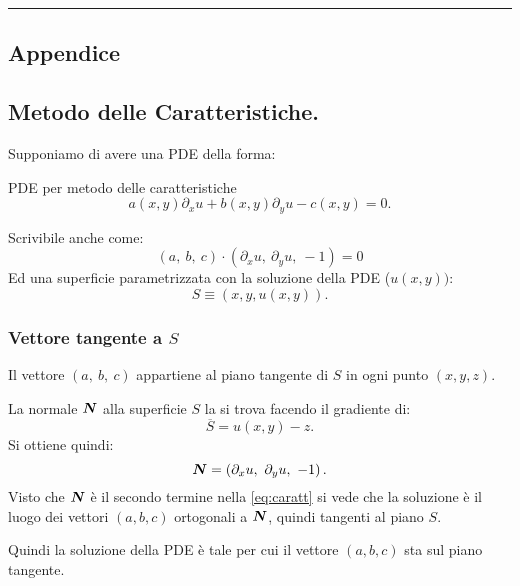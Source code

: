 \noindent\rule{0.48\textwidth}{0.7pt}
\addtocounter{Sec}{\value{section}}%
\begin{appendices}
\section*{Appendice}%
\setcounter{section}{\theSec}%
\setcounter{subsection}{0}%
\renewcommand{\thesubsection}{\arabic{section}.\Alph{subsection}}

\subsection{Metodo delle Caratteristiche.}
\label{sub:caratteristiche}
Supponiamo di avere una PDE della forma:
\begin{redbox}{PDE per metodo delle caratteristiche}
\[
    a(x,y) \partial_{x}u + b(x,y) \partial_{y}u - c(x, y) = 0
.\] 
\end{redbox}
\noindent
Scrivibile anche come:
\begin{equation}
    \left(a,\ b,\ c\right)\cdot \left(\partial_{x}u,\ \partial_{y}u,\ -1\right) = 0
    \label{eq:caratt}
\end{equation}
Ed una superficie parametrizzata con la soluzione della PDE ($u(x,y))$: 
\[
    S \equiv (x,y, u(x,y) ) 
.\] 

\noindent
\subsubsection{Vettore tangente a $S$}%
\label{subsub:Vettore tangente a S}
\begin{bluebox}{}
Il vettore $\left(a, \ b, \ c\right)$ appartiene al piano tangente di $S$ in ogni punto $\left(x, y, z\right)$.
\end{bluebox}
\noindent
La normale $\boldsymbol{N}$ alla superficie $S$ la si trova facendo il gradiente di:
\[
    \overline{S} = u(x,y) - z
.\] 
Si ottiene quindi:
\[
    \boldsymbol{N}  = \left(\partial_{x}u, \ \partial_{y}u, \ -1\right)
.\] 
Visto che $\boldsymbol{N}$ è il secondo termine nella \ref{eq:caratt} si vede che la soluzione è il luogo dei vettori $(a, b,c)$ ortogonali a $\boldsymbol{N}$, quindi tangenti al piano $S$.

\noindent
Quindi la soluzione della PDE è tale per cui il vettore $(a,b,c)$ sta sul piano tangente.


\end{appendices}
